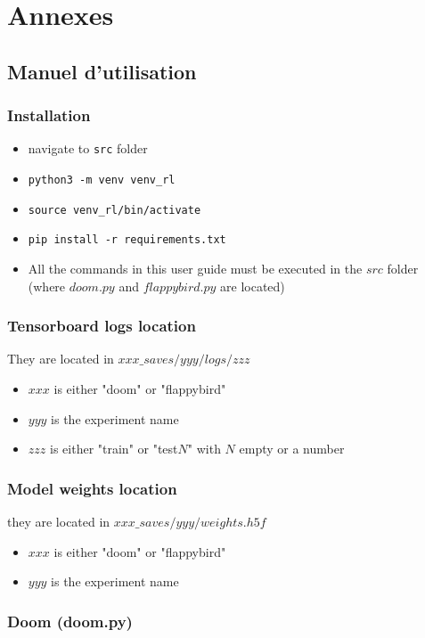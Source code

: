 \documentclass[a4paper,10pt,openany,oneside]{report}
\begin{document}
\chapter{Annexes}
\thispagestyle{headings}
\section{Manuel d'utilisation}
\subsection*{Installation}

\begin{itemize}
	\item navigate to \lstinline{src} folder
	\item \lstinline{python3 -m venv venv_rl}
	\item \lstinline{source venv_rl/bin/activate}
	\item \lstinline{pip install -r requirements.txt}
	\item All the commands in this user guide must be executed in the $src$ folder (where $doom.py$ and $flappybird.py$ are located)
\end{itemize}

\subsection*{Tensorboard logs location}
They are located in $xxx\_saves/yyy/logs/zzz$
\begin{itemize}
	\item $xxx$ is either "doom" or "flappybird"
	\item $yyy$ is the experiment name
	\item $zzz$ is either "train" or "test$N$" with $N$ empty or a number
\end{itemize}

\subsection*{Model weights location}
they are located in $xxx\_saves/yyy/weights.h5f$
\begin{itemize}
	\item $xxx$ is either "doom" or "flappybird"
	\item $yyy$ is the experiment name
\end{itemize}
\newpage
\subsection*{Doom (doom.py)}
\end{document}
